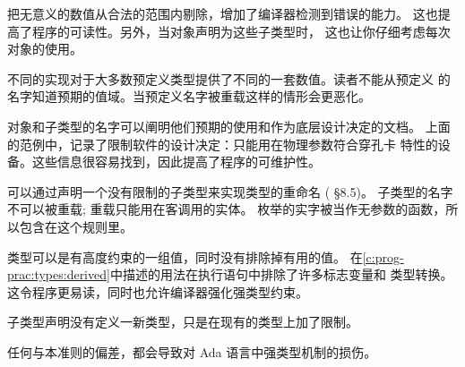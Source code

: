 \begin{blockindent}
把无意义的数值从合法的范围内剔除，增加了编译器检测到错误的能力。
这也提高了程序的可读性。另外，当对象声明为这些子类型时，
这也让你仔细考虑每次对象的使用。

不同的实现对于大多数预定义类型提供了不同的一套数值。读者不能从预定义
的名字知道预期的值域。当预定义名字被重载这样的情形会更恶化。

对象和子类型的名字可以阐明他们预期的使用和作为底层设计决定的文档。
上面的范例中，记录了限制软件的设计决定：只能用在物理参数符合穿孔卡
特性的设备。这些信息很容易找到，因此提高了程序的可维护性。

可以通过声明一个没有限制的子类型来实现类型的重命名 (\cite{arm95} \S{}8.5)。
子类型的名字不可以被重载; 重载只能用在客调用的实体。
枚举的实字被当作无参数的函数，所以包含在这个规则里。

类型可以是有高度约束的一组值，同时没有排除掉有用的值。
在\ref{c:prog-prac:types:derived}中描述的用法在执行语句中排除了许多标志变量和
类型转换。这令程序更易读，同时也允许编译器强化强类型约束。
\end{blockindent}

\begin{blockindent}
子类型声明没有定义一新类型，只是在现有的类型上加了限制。

任何与本准则的偏差，都会导致对 Ada 语言中强类型机制的损伤。
\end{blockindent}


\begin{blockindent}

\end{blockindent}
